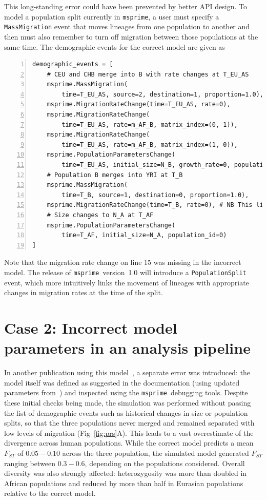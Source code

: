 \documentclass{article}
\newcommand{\msprime}[0]{\texttt{msprime}}
\begin{document}
This long-standing error could have been prevented by better API design.
To model a population split currently in \msprime, a user must specify a
\texttt{MassMigration} event that moves lineages from one population to another
and then must also remember to turn off migration
between those populations at the same time.
The demographic events for the correct model are given as


\begin{Verbatim}[numbers=left, xleftmargin=.5in]
demographic_events = [
    # CEU and CHB merge into B with rate changes at T_EU_AS
    msprime.MassMigration(
        time=T_EU_AS, source=2, destination=1, proportion=1.0),
    msprime.MigrationRateChange(time=T_EU_AS, rate=0),
    msprime.MigrationRateChange(
        time=T_EU_AS, rate=m_AF_B, matrix_index=(0, 1)),
    msprime.MigrationRateChange(
        time=T_EU_AS, rate=m_AF_B, matrix_index=(1, 0)),
    msprime.PopulationParametersChange(
        time=T_EU_AS, initial_size=N_B, growth_rate=0, population_id=1),
    # Population B merges into YRI at T_B
    msprime.MassMigration(
        time=T_B, source=1, destination=0, proportion=1.0),
    msprime.MigrationRateChange(time=T_B, rate=0), # NB This line was missing!!!
    # Size changes to N_A at T_AF
    msprime.PopulationParametersChange(
        time=T_AF, initial_size=N_A, population_id=0)
]
\end{Verbatim}
Note that the migration rate change on line 15 was missing in the incorrect model.
The release of \msprime\ version~1.0 will introduce a \texttt{PopulationSplit} event,
which more intuitively links the movement of lineages with appropriate changes in
migration rates at the time of the split.

\section*{Case 2: Incorrect model parameters in an analysis pipeline}

In another publication using this model~\citep{martin2017human},
a separate error was introduced: the model itself was defined as suggested
in the documentation (using updated parameters
from~\citet{gravel2011demographic}) and inspected
using the \msprime\ debugging tools.
Despite these initial checks being made, the simulation
was performed without passing the list of demographic events such as historical
changes in size or population splits, so that the three populations
never merged and remained separated with low levels of migration (Fig~\ref{fig:prs}A).
This leads to a vast overestimate of the divergence across human populations.
While the correct model predicts a mean $F_{ST}$ of
$0.05 - 0.10$ across the three population, the simulated model generated $F_{ST}$
ranging between $0.3 - 0.6$, depending on the populations considered.
Overall diversity was also strongly affected: heterozygosity was more than
doubled in African populations and reduced by more than half in Eurasian populations
relative to the correct model.
\end{document}
